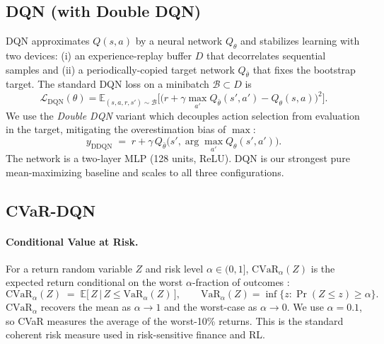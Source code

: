\documentclass[a4paper,11pt]{article}
\theoremstyle{definition}
\begin{document}
\subsection{DQN (with Double DQN)}

DQN \citep{mnih2015} approximates $Q(s, a)$ by a neural network $Q_\theta$ and stabilizes learning with two devices: (i) an experience-replay buffer $D$ that decorrelates sequential samples and (ii) a periodically-copied target network $Q_{\bar\theta}$ that fixes the bootstrap target. The standard DQN loss on a minibatch $\mathcal{B} \subset D$ is
\begin{equation*}
    \mathcal{L}_\text{DQN}(\theta) = \mathbb{E}_{(s, a, r, s') \sim \mathcal{B}} \Big[ \bigl(r + \gamma \max_{a'} Q_{\bar\theta}(s', a') - Q_\theta(s, a)\bigr)^2 \Big].
\end{equation*}
We use the \emph{Double DQN} variant \citep{vanhasselt2016} which decouples action selection from evaluation in the target, mitigating the overestimation bias of $\max$:
\begin{equation}
    y_\text{DDQN} \;=\; r + \gamma\, Q_{\bar\theta}\bigl(s', \arg\max_{a'} Q_\theta(s', a')\bigr).
    \label{eq:ddqn}
\end{equation}
The network is a two-layer MLP (128 units, ReLU). DQN is our strongest pure mean-maximizing baseline and scales to all three configurations.

\subsection{CVaR-DQN}

\paragraph{Conditional Value at Risk.} For a return random variable $Z$ and risk level $\alpha \in (0, 1]$, $\mathrm{CVaR}_\alpha(Z)$ is the expected return conditional on the worst $\alpha$-fraction of outcomes \citep{rockafellar2000,chow2015}:
\begin{equation}
    \mathrm{CVaR}_\alpha(Z) \;=\; \mathbb{E}\bigl[\,Z \,\big|\, Z \leq \mathrm{VaR}_\alpha(Z)\,\bigr], \qquad \mathrm{VaR}_\alpha(Z) = \inf\{z : \Pr(Z \leq z) \geq \alpha\}.
    \label{eq:cvar_def}
\end{equation}
$\mathrm{CVaR}_\alpha$ recovers the mean as $\alpha \to 1$ and the worst-case as $\alpha \to 0$. We use $\alpha = 0.1$, so CVaR measures the average of the worst-10\% returns. This is the standard coherent risk measure used in risk-sensitive finance and RL.
\end{document}
